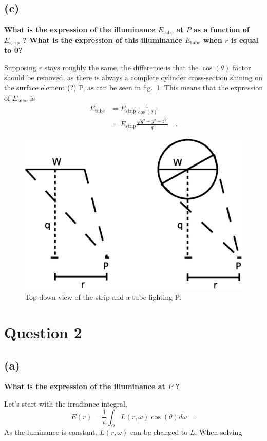 \documentclass{report}
\begin{document}
\subsection{(c)}
\textbf{What is the expression of the illuminance $E_{\text{tube}}$ at $P$ as a function of $E_{\text{strip}}$ ?
What is the expression of this illuminance $E_{\text{tube}}$ when $r$ is equal to 0?}

Supposing $r$ stays roughly the same, the difference is that the $\cos(\theta)$ factor should be removed, as there is always a complete cylinder cross-section shining on the surface element (?) P, as can be seen in fig.~\ref{q1c:setup}. This means that the expression of $E_{\text{tube}}$ is
\begin{align}
E_{\text{tube}} &= E_{\text{strip}} \frac{1}{\cos(\theta)} \\
                &= E_{\text{strip}} \frac{\sqrt{q^2+y^2+z^2}}{q}
\quad.
\end{align}

\begin{figure}
  \centering
  \includegraphics[width=0.45\linewidth]{q1c_setup.eps}
  \caption[Problem setup]
   {Top-down view of the strip and a tube lighting P.}
  \label{q1c:setup}
\end{figure}

\section{Question 2}
\subsection{(a)}
\textbf{What is the expression of the illuminance at $P$ ?}

Let's start with the irradiance integral,
\begin{equation}
E(r) = \frac{1}{\pi} \int_{\Omega} L(r,\omega)\cos(\theta) d\omega
\quad.
\end{equation}
As the luminance is constant, $L(r,\omega)$ can be changed to $L$. When solving 
\end{document}
